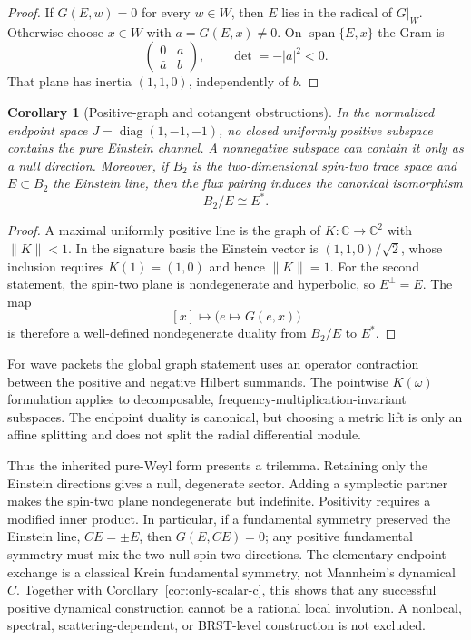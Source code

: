 \documentclass[11pt]{article}
\newtheorem{corollary}[theorem]{Corollary}
\theoremstyle{definition}
\theoremstyle{remark}
\newcommand{\C}{\mathbb C}
\begin{document}
\begin{proof}
If \(G(E,w)=0\) for every \(w\in W\), then \(E\) lies in the radical of
\(G|_W\).  Otherwise choose \(x\in W\) with \(a=G(E,x)\ne0\).  On
\(\operatorname{span}\{E,x\}\) the Gram is
\[
\begin{pmatrix}
0&a\\ \bar a&b
\end{pmatrix},
\qquad
\det=-|a|^2<0.
\]
That plane has inertia \((1,1,0)\), independently of \(b\).
\end{proof}

\begin{corollary}[Positive-graph and cotangent obstructions]
\label{cor:positive-graph}
In the normalized endpoint space
\(J=\operatorname{diag}(1,-1,-1)\), no closed uniformly positive subspace
contains the pure Einstein channel.  A nonnegative subspace can contain it
only as a null direction.  Moreover, if \(B_2\) is the two-dimensional
spin-two trace space and \(E\subset B_2\) the Einstein line, then the flux
pairing induces the canonical isomorphism
\[
B_2/E\cong E^*.
\]
\end{corollary}

\begin{proof}
A maximal uniformly positive line is the graph of
\(K:\C\to\C^2\) with \(\|K\|<1\).  In the signature basis the Einstein
vector is \((1,1,0)/\sqrt2\), whose inclusion requires
\(K(1)=(1,0)\) and hence \(\|K\|=1\).  For the second statement, the
spin-two plane is nondegenerate and hyperbolic, so \(E^\perp=E\).  The map
\[
[x]\longmapsto\bigl(e\mapsto G(e,x)\bigr)
\]
is therefore a well-defined nondegenerate duality from \(B_2/E\) to \(E^*\).
\end{proof}

For wave packets the global graph statement uses an operator contraction
between the positive and negative Hilbert summands.  The pointwise
\(K(\omega)\) formulation applies to decomposable,
frequency-multiplication-invariant subspaces.  The endpoint duality is
canonical, but choosing a metric lift is only an affine splitting and does
not split the radial differential module.

Thus the inherited pure-Weyl form presents a trilemma.  Retaining only the
Einstein directions gives a null, degenerate sector.  Adding a symplectic
partner makes the spin-two plane nondegenerate but indefinite.  Positivity
requires a modified inner product.  In particular, if a fundamental
symmetry preserved the Einstein line, \(CE=\pm E\), then
\(G(E,CE)=0\); any positive fundamental symmetry must mix the two null
spin-two directions.  The elementary endpoint exchange is a classical Krein
fundamental symmetry, not Mannheim's dynamical \(C\).  Together with
Corollary~\ref{cor:only-scalar-c}, this shows that any successful positive
dynamical construction cannot be a rational local involution.  A
nonlocal, spectral, scattering-dependent, or BRST-level construction is not
excluded.
\end{document}
